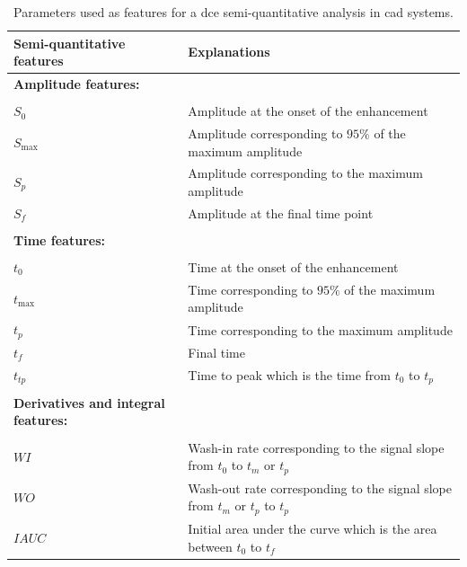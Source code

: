 \begin{table}
  \caption{Parameters used as features for a \acs*{dce} semi-quantitative analysis in \acs*{cad} systems.}
  \centering
  \begin{tabularx}{\textwidth}{l X}
    \toprule
    \textbf{Semi-quantitative features} & \textbf{Explanations} \\
    \midrule
    \textbf{Amplitude features:} & \\ \\ [-1.5ex]
    \quad $S_0$ & Amplitude at the onset of the enhancement \\
    \quad $S_{\max}$ & Amplitude corresponding to $95\%$ of the maximum amplitude \\
    \quad $S_{p}$ & Amplitude corresponding to the maximum amplitude \\
    \quad $S_f$ & Amplitude at the final time point \\ \\ [-1.5ex]
    \textbf{Time features:} & \\ \\ [-1.5ex]
    \quad $t_0$ & Time at the onset of the enhancement \\
    \quad $t_{\max}$ & Time corresponding to $95\%$ of the maximum amplitude \\
    \quad $t_{p}$ & Time corresponding to the maximum amplitude \\
    \quad $t_{f}$ & Final time \\
    \quad $t_{tp}$ & Time to peak which is the time from $t_0$ to $t_p$ \\ \\ [-1.5ex]
    \textbf{Derivatives and integral features:} & \\ \\ [-1.5ex]
    \quad $WI$ & Wash-in rate corresponding to the signal slope from $t_0$ to $t_m$ or $t_p$ \\
    \quad $WO$ & Wash-out rate corresponding to the signal slope from $t_m$ or $t_p$ to $t_p$ \\
    \quad $IAUC$ & Initial area under the curve which is the area between $t_0$ to $t_{f}$ \\
    \bottomrule
  \end{tabularx}
  \label{tab:semiqua}
\end{table}

